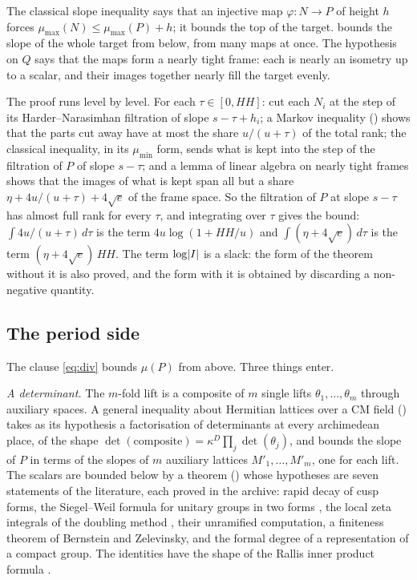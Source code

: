 The classical slope inequality says that an injective map $\varphi\colon N\to P$ of height $h$
forces $\mu_{\max}(N)\le\mu_{\max}(P)+h$; it bounds the top of the target.  bounds
the slope of the whole target from below, from many maps at once. The hypothesis on $Q$ says
that the maps form a nearly tight frame: each is nearly an isometry up to a scalar, and their
images together nearly fill the target evenly.

The proof runs level
by level. For each $\tau\in[0,HH]$: cut each $N_i$ at the step of its Harder--Narasimhan
filtration of slope $s-\tau+h_i$; a Markov inequality () shows that the parts
cut away have at most the share $u/(u+\tau)$ of the total rank; the classical inequality, in
its $\mu_{\min}$ form, sends what is kept into the step of the filtration of $P$ of slope
$s-\tau$; and a lemma of linear algebra on nearly tight frames shows that the images of what is
kept span all but a share $\eta+4u/(u+\tau)+4\sqrt e$ of the frame space. So the filtration of
$P$ at slope $s-\tau$ has almost full rank for every $\tau$, and integrating over $\tau$ gives
the bound: $\int4u/(u+\tau)\,d\tau$ is the term $4u\log(1+HH/u)$ and $\int(\eta+4\sqrt e)\,d\tau$
is the term $(\eta+4\sqrt e)\,HH$. The term $\log\lvert I\rvert$ is a slack: the form of the theorem
without it is also proved, and the form with it is obtained by discarding a non-negative
quantity.

\subsection{The period side}\label{sec:period}
The clause \eqref{eq:div} bounds $\mu(P)$ from above. Three things enter.

\emph{A determinant.} The $m$-fold lift is a composite of $m$ single lifts
$\theta_1,\dots,\theta_m$ through auxiliary spaces. A general inequality about Hermitian
lattices over a CM field \lvS{} () takes as its hypothesis a factorisation of
determinants at every archimedean place, of the shape
$\det(\text{composite})=\kappa^{D}\prod_j\det(\theta_j)$, and bounds the slope of $P$ in terms
of the slopes of $m$ auxiliary lattices $M'_1,\dots,M'_m$, one for each lift. The scalars are
bounded below by a theorem \lvS{} () whose hypotheses are
seven statements of the literature, each proved in the archive: rapid decay of cusp forms,
the Siegel--Weil formula for unitary groups in two forms
\cite{weil1965,ichino2004,ichino2007}, the local zeta integrals of the doubling method
\cite{psrallis1987}, their unramified computation, a finiteness theorem of Bernstein and
Zelevinsky, and the formal degree of a representation of a compact group. The identities have
the shape of the Rallis inner product formula \cite{rallis1984}.

